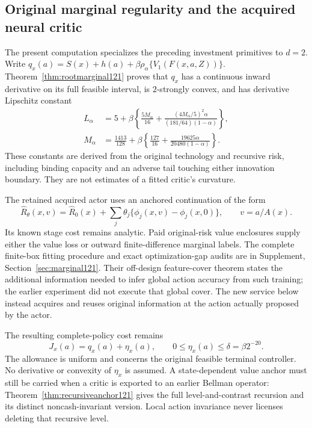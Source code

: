\subsection{Original marginal regularity and the acquired neural critic}
\label{sec:regularity122}

The present computation specializes the preceding investment primitives to
$d=2$. Write $q_x(a)=S(x)+h(a)+\beta\rho_\alpha
\{V_1(F(x,a,Z))\}$. Theorem~\ref{thm:rootmarginal121} proves that
$q_x$ has a continuous inward derivative on its full feasible interval,
is $2$-strongly convex, and has derivative Lipschitz constant
\begin{align*}
 L_\alpha&=5+\beta\left\{\frac{5M_\alpha}{16}
          +\frac{(4M_\alpha/5)^2\alpha}{(181/64)(1-\alpha)}\right\},\\
 M_\alpha&=\frac{1413}{128}
   +\beta\left\{\frac{127}{16}
                 +\frac{19625\alpha}{20480(1-\alpha)}\right\}.
\end{align*}
These constants are derived from the original technology and recursive risk,
including binding capacity and an adverse tail touching either innovation
boundary. They are not estimates of a fitted critic's curvature.

The retained acquired actor uses an anchored continuation of the form
\[
 \widehat R_\theta(x,v)=\widehat R_0(x)
       +\sum_j\theta_j\{\phi_j(x,v)-\phi_j(x,0)\},\qquad
 v=a/A(x).
\]
Its known stage cost remains analytic. Paid original-risk value enclosures
supply either the value loss or outward finite-difference marginal labels.
The complete finite-box fitting procedure and exact optimization-gap audits
are in Supplement, Section~\ref{sec:marginal121}. Their off-design
feature-cover theorem states the additional information needed to infer
global action accuracy from such training; the earlier experiment did not
execute that global cover. The new service below instead acquires and reuses
original information at the action actually proposed by the actor.

The resulting complete-policy cost remains
\[
 J_x(a)=q_x(a)+\eta_x(a),\qquad
 0\le\eta_x(a)\le\delta=\beta 2^{-20}.
\]
The allowance is uniform and concerns the original feasible terminal
controller. No derivative or convexity of $\eta_x$ is assumed. A
state-dependent value anchor must still be carried when a critic is exported
to an earlier Bellman operator: Theorem~\ref{thm:recursiveanchor121} gives
the full level-and-contrast recursion and its distinct noncash-invariant
version. Local action invariance never licenses deleting that recursive level.

